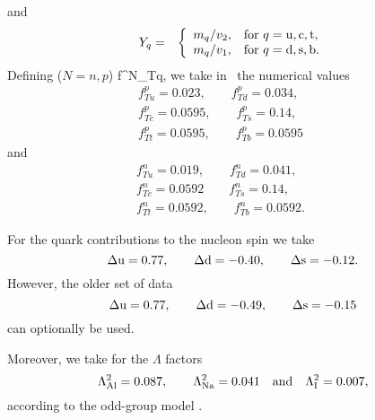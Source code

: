 and
\begin{eqnarray}
   Y_q & = & \left\{ \begin{array}{ll}
   m_q / v_2 , & {\rm for\ } q={\rm u,c,t}, \\
   m_q / v_1 , & {\rm for\ } q={\rm d,s,b}.
   \end{array} \right.
\end{eqnarray}
Defining ($N=n,p$)
\beq
f^N_{Tq},
\eeq
we take in \ds\ the numerical values \cite{Gasser:1990ce}
\begin{eqnarray}
   & f^p_{Tu} = 0.023, \qquad f^p_{Td} = 0.034, \qquad
    &\nonumber\\
&f^p_{Tc} = 0.0595, \qquad f^p_{Ts} = 0.14, \qquad&\nonumber\\
&f^p_{Tt} = 0.0595, \qquad f^p_{Tb}=0.0595 \qquad
\end{eqnarray}
and
\begin{eqnarray}
   & f^n_{Tu} = 0.019, \qquad f^n_{Td} = 0.041, \qquad
    &\nonumber\\
&f^n_{Tc} = 0.0592 \qquad f^n_{Ts} = 0.14, \qquad&\nonumber\\
&f^n_{Tt} = 0.0592, \qquad f^n_{Tb} = 0.0592. \qquad
\end{eqnarray}

For the quark contributions to the nucleon spin we
take \cite{Adams:1995ufa}
\begin{equation}
   \Delta {\rm u} = 0.77, \qquad \Delta {\rm d} = -0.40, \qquad
   \Delta {\rm s} = -0.12 .
\end{equation}
However, the older set of data \cite{Jaffe:1989jz}
\begin{equation}
   \Delta {\rm u} = 0.77, \qquad \Delta {\rm d} = -0.49, \qquad
   \Delta {\rm s} = -0.15
\end{equation}
can optionally be used.

Moreover, we take for the $\Lambda$ factors
\begin{equation}
   \Lambda^2_{\rm Al} = 0.087, \qquad
   \Lambda^2_{\rm Na} = 0.041 \quad {\rm and} \quad
   \Lambda^2_{\rm I} = 0.007,
   \label{detrate2}
\end{equation}
according to the odd-group model \cite{Engel:1989ix}.


